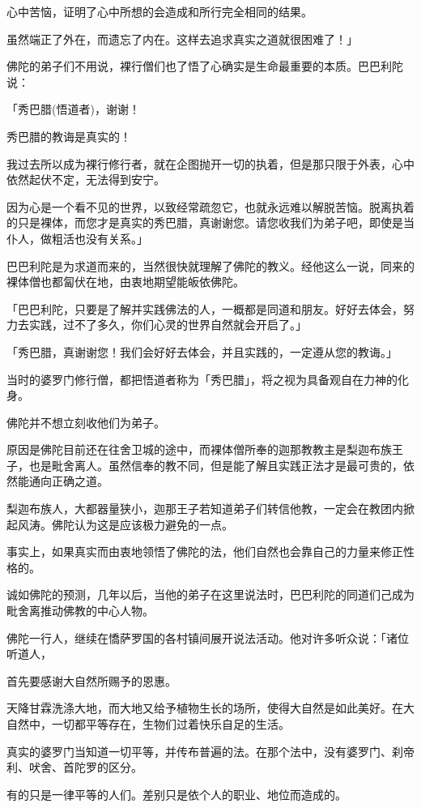 \documentclass[twoside,openany]{book}
\begin{document}
心中苦恼，证明了心中所想的会造成和所行完全相同的结果。

虽然端正了外在，而遗忘了内在。这样去追求真实之道就很困难了！」

佛陀的弟子们不用说，裸行僧们也了悟了心确实是生命最重要的本质。巴巴利陀说：

「秀巴腊(悟道者)，谢谢！

秀巴腊的教诲是真实的！

我过去所以成为裸行修行者，就在企图抛开一切的执着，但是那只限于外表，心中依然起伏不定，无法得到安宁。

因为心是一个看不见的世界，以致经常疏忽它，也就永远难以解脱苦恼。脱离执着的只是裸体，而您才是真实的秀巴腊，真谢谢您。请您收我们为弟子吧，即使是当仆人，做粗活也没有关系。」

巴巴利陀是为求道而来的，当然很快就理解了佛陀的教义。经他这么一说，同来的裸体僧也都匐伏在地，由衷地期望能皈依佛陀。

「巴巴利陀，只要是了解并实践佛法的人，一概都是同道和朋友。好好去体会，努力去实践，过不了多久，你们心灵的世界自然就会开启了。」

「秀巴腊，真谢谢您！我们会好好去体会，并且实践的，一定遵从您的教诲。」

当时的婆罗门修行僧，都把悟道者称为「秀巴腊」，将之视为具备观自在力神的化身。

佛陀并不想立刻收他们为弟子。

原因是佛陀目前还在往舍卫城的途中，而裸体僧所奉的迦那教教主是梨迦布族王子，也是毗舍离人。虽然信奉的教不同，但是能了解且实践正法才是最可贵的，依然能通向正确之道。

梨迦布族人，大都器量狭小，迦那王子若知道弟子们转信他教，一定会在教团内掀起风涛。佛陀认为这是应该极力避免的一点。

事实上，如果真实而由衷地领悟了佛陀的法，他们自然也会靠自己的力量来修正性格的。

诚如佛陀的预测，几年以后，当他的弟子在这里说法时，巴巴利陀的同道们己成为毗舍离推动佛教的中心人物。

佛陀一行人，继续在憍萨罗国的各村镇间展开说法活动。他对许多听众说：「诸位听道人，

首先要感谢大自然所赐予的恩惠。

天降甘霖洗涤大地，而大地又给予植物生长的场所，使得大自然是如此美好。在大自然中，一切都平等存在，生物们过着快乐自足的生活。

真实的婆罗门当知道一切平等，并传布普遍的法。在那个法中，没有婆罗门、刹帝利、吠舍、首陀罗的区分。

有的只是一律平等的人们。差别只是依个人的职业、地位而造成的。
\end{document}
